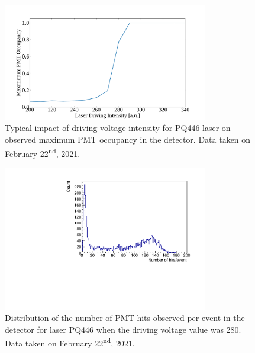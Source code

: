 \begin{figure}
    \centering
    \includegraphics[width=0.8\textwidth]{3_SMELLIEHardware/images/smellie_intensity_scan_pq446_old.pdf}
    \caption[Typical impact of driving voltage intensity for PQ446 laser on observed maximum PMT occupancy in the detector]
    {Typical impact of driving voltage intensity for PQ446 laser on observed maximum PMT occupancy in the detector. Data taken on February 22\textsuperscript{nd}, 2021.}
    \label{fig:pq_old_intensity_dependence}
\end{figure}

\begin{figure}
    \centering
    \includegraphics[width=0.8\textwidth]{3_SMELLIEHardware/images/run_268221_8_nhit_dist.pdf}
    \caption[Distribution of the number of PMT hits observed per event for laser PQ446, before the VFA was added]
    {Distribution of the number of PMT hits observed per event in the detector for laser PQ446 when the driving voltage value was 280. Data taken on February 22\textsuperscript{nd}, 2021.}
    \label{fig:pq_threshold_intensity_variation}
\end{figure}

